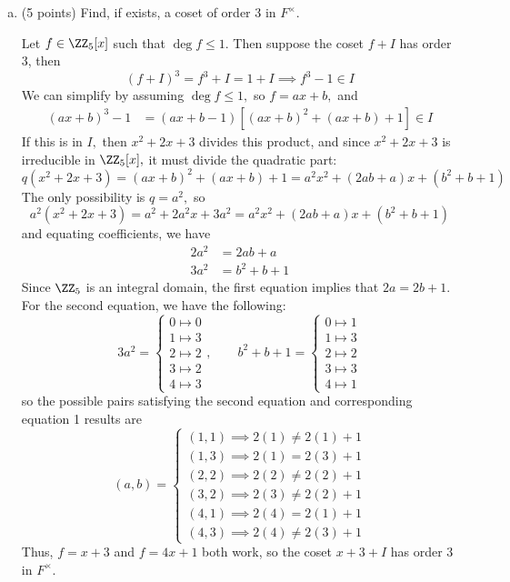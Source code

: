 \documentclass{article}
\begin{document}
\begin{itemize}
\begin{enumerate}[(a)]
			\item (5 points) Find, if exists, a coset of order 3 in $F^\times.$
				\begin{soln}
					Let $f\in \ZZ_5[x]$ such that $\deg f\le 1.$ Then suppose the coset $f+I$ has order 3, then 
					\[(f+I)^3=f^3+I=1+I\implies f^3-1\in I\]
					We can simplify by assuming $\deg f\le 1,$ so $f=ax+b,$ and 
					\begin{align*}
						(ax+b)^3-1 &= (ax+b-1)\left[ (ax+b)^2+(ax+b)+1 \right] \in I
					\end{align*}
					If this is in $I,$ then $x^2+2x+3$ divides this product, and since $x^2+2x+3$ is irreducible in $\ZZ_5[x],$ it must divide the quadratic part:
					\[q(x^2+2x+3) = (ax+b)^2+(ax+b)+1 = a^2x^2 + (2ab+a)x + (b^2+b+1)\]
					The only possibility is $q=a^2,$ so 
					\[a^2(x^2+2x+3)=a^2+2a^2x+3a^2 = a^2x^2 + (2ab+a)x + (b^2+b+1)\]
					and equating coefficients, we have
					\begin{align*}
						2a^2 &= 2ab+a \\
						3a^2 &= b^2+b+1
					\end{align*}
					Since $\ZZ_5$ is an integral domain, the first equation implies that $2a=2b+1.$ For the second equation, we have the following:
					\[3a^2 = \begin{cases}
							0 \mapsto 0 \\
							1\mapsto 3 \\
							2\mapsto 2 \\
							3\mapsto 2\\
							4\mapsto 3
						\end{cases}, \quad\quad b^2+b+1 =\begin{cases}
							0\mapsto 1 \\
							1\mapsto 3 \\
							2\mapsto 2 \\
							3\mapsto 3 \\
							4\mapsto 1
					\end{cases}\]
					so the possible pairs satisfying the second equation and corresponding equation 1 results are
					\[(a, b) = \begin{cases}
							(1, 1) \implies 2(1)\neq 2(1)+1\\
							(1, 3) \implies 2(1) = 2(3)+1\\
							(2, 2) \implies 2(2) \neq 2(2)+1\\
							(3, 2) \implies 2(3) \neq 2(2)+1 \\
							(4, 1) \implies 2(4) = 2(1)+1 \\
							(4, 3) \implies 2(4) \neq 2(3)+1
					\end{cases}\]
					Thus, $f=x+3$ and $f=4x+1$ both work, so the coset $x+3+I$ has order 3 in $F^\times.$
				\end{soln}
				

\end{enumerate}
\end{itemize}
\end{document}
